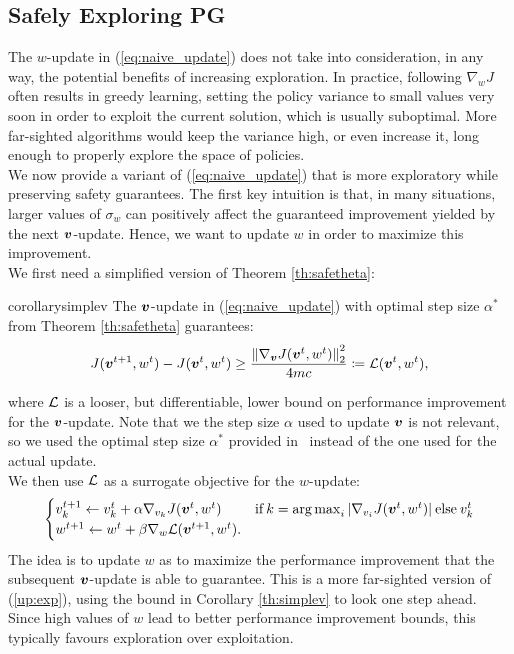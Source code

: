 \subsection{Safely Exploring PG}\label{sec:explore+safe}
The $w$-update in (\ref{eq:naive_update}) does not take into consideration, in any way, the potential benefits of increasing exploration. In practice, following $\nabla_{w}J$ often results in greedy learning, setting the policy variance to small values very soon in order to exploit the current solution, which is usually suboptimal. More far-sighted algorithms would keep the variance high, or even increase it, long enough to properly explore the space of policies. \\
We now provide a variant of (\ref{eq:naive_update}) that is more exploratory while preserving safety guarantees. The first key intuition is that, in many situations, larger values of $\sigma_{w}$ can positively affect the guaranteed improvement yielded by the next $\vv$-update. Hence, we want to update $w$ in order to maximize this improvement. \\
We first need a simplified version of Theorem \ref{th:safetheta}:
\begin{restatable}[]{corollary}{simplev}\label{th:simplev}
	The $\vv$-update in (\ref{eq:naive_update}) with optimal step size $\alpha^*$ from Theorem \ref{th:safetheta} guarantees:
	\begin{align*}
	J(\vv^{t+1},w^t) - J(\vv^t,w^t) \geq \frac{\norm[2]{\gradJ[\vv]{\vv^t,w^t}}^2}{4mc}
	\coloneqq \Deltav(\vv^t,w^t),
	\end{align*}
\end{restatable}
where $\Deltav$ is a looser, but differentiable, lower bound on performance improvement for the $\vv$-update. Note that we the step size $\alpha$ used to update $\vv$ is not relevant, so we used the optimal step size $\alpha^*$ provided in~\cite{adaptive_batch} instead of the one used for the actual update. \\
We then use $\Deltav$ as a surrogate objective for the $w$-update:
%
\begin{align}\label{up:exp}
\begin{cases}
v_{k}^{t+1} \gets v_{k}^t + \alpha\gradJ[v_{k}]{\vv^t,w^t}
& \text{if}\:k =  \argmax_i |\gradJ[v_i]{\vv^t, w^t}| \:\text{else}\:v_{k}^t\\
w^{t+1} \gets w^t + \beta\gradDelta(\vv^{t+1}, w^t).
\end{cases}
\end{align}
%
The idea is to update $w$ as to maximize the performance improvement that the subsequent $\vv$-update is able to guarantee. This is a more far-sighted version of (\ref{up:exp}), using the bound in Corollary \ref{th:simplev} to look one step ahead. Since high values of $w$ lead to better performance improvement bounds, this typically favours exploration over exploitation.\\
